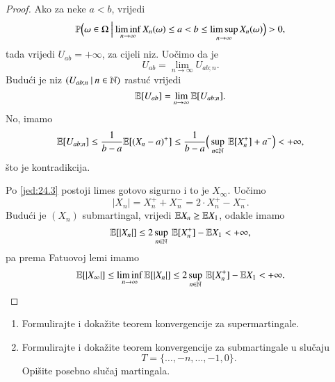 \begin{proof}
    Ako za neke $a < b$, vrijedi
    \begin{equation*}
        \mathbb{P} \Big( {\omega \in \Omega} \: \Big| \: {\liminf\limits_{n \to \infty} X_n (\omega) \leq a < b \leq \limsup\limits_{n \to \infty} X_n (\omega) } \Big) > 0,
    \end{equation*}
    tada vrijedi $U_{a b} = +\infty$, za cijeli niz.
    Uo\v cimo da je
    \begin{equation*}
        U_{a b} = \lim\limits_{n \to \infty} U_{a b ; n}.
    \end{equation*}
    Budu\' ci je niz $({U_{a b; n}} \: | \: {n \in \mathbb{N}})$ rastu\' c vrijedi
    \begin{equation*}
        \mathbb{E} [U_{a b}] = \lim\limits_{n \to \infty} \mathbb{E} [U_{a b; n}].
    \end{equation*}
    No, imamo
    \begin{equation*}
        \mathbb{E} [U_{a b; n}] \leq \frac{1}{b - a} \mathbb{E} [(X_n - a)^+] \leq \frac{1}{b - a} \Big( \sup\limits_{n \in \mathbb{N}} \: \mathbb{E} [X_n^+] + a^- \Big) < +\infty,
    \end{equation*}
    \v sto je kontradikcija.

    Po \eqref{jed:24.3} postoji limes gotovo sigurno i to je $X_\infty$.
    Uo\v cimo
    \begin{equation*}
        |X_n| = X_n^+ + X_n^- = 2 \cdot X_n^+ - X_n^- .
    \end{equation*}
    Budu\' ci je $(X_n)$ submartingal, vrijedi $\mathbb{E} X_n \geq \mathbb{E} X_1$, odakle imamo
    \begin{equation*}
        \mathbb{E} [|X_n|] \leq 2 \sup\limits_{n \in \mathbb{N}} \: \mathbb{E} [X_n^+] - \mathbb{E} X_1 < +\infty,
    \end{equation*}
    pa prema Fatuovoj lemi imamo
    \begin{equation*}
        \mathbb{E} [|X_\infty|] \leq \liminf\limits_{n \to \infty} \mathbb{E} [|X_n|] \leq 2 \sup\limits_{n \in \mathbb{N}} \: \mathbb{E} [X_n^+] - \mathbb{E} X_1 < +\infty.
    \end{equation*}
\end{proof}

\begin{zad} \label{zad:24.5}
    \begin{enumerate}[label=(\alph*)]
        \item \label{zad:24.5.1}
        Formulirajte i doka\v zite teorem konvergencije za supermartingale.
        \item \label{zad:24.5.2}
        Formulirajte i doka\v zite teorem konvergencije za submartingale u slu\v caju
        \begin{equation*}
            T = \{ \ldots, -n, \ldots, -1, 0 \}.
        \end{equation*}
        Opi\v site posebno slu\v caj martingala.
    \end{enumerate}
\end{zad}